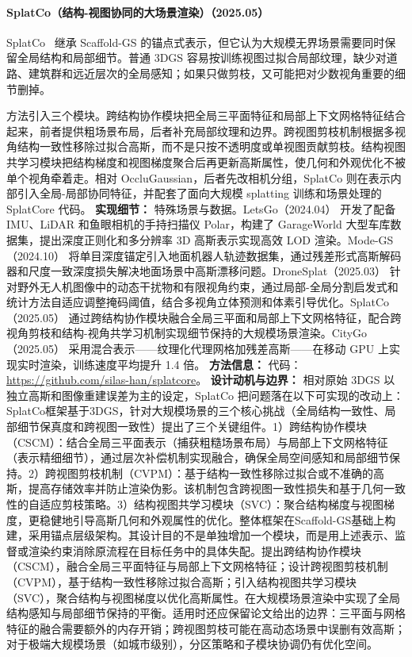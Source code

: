 \paragraph{SplatCo（结构-视图协同的大场景渲染）（2025.05）}
SplatCo~\cite{2505_17951} 继承 Scaffold-GS 的锚点式表示，但它认为大规模无界场景需要同时保留全局结构和局部细节。普通 3DGS 容易按训练视图过拟合局部纹理，缺少对道路、建筑群和远近层次的全局感知；如果只做剪枝，又可能把对少数视角重要的细节删掉。

方法引入三个模块。跨结构协作模块把全局三平面特征和局部上下文网格特征结合起来，前者提供粗场景布局，后者补充局部纹理和边界。跨视图剪枝机制根据多视角结构一致性移除过拟合高斯，而不是只按不透明度或单视图贡献剪枝。结构视图共学习模块把结构梯度和视图梯度聚合后再更新高斯属性，使几何和外观优化不被单个视角牵着走。相对 OccluGaussian，后者先改相机分组，SplatCo 则在表示内部引入全局-局部协同特征，并配套了面向大规模 splatting 训练和场景处理的 SplatCore 代码。
\textbf{实现细节：} 特殊场景与数据。LetsGo（2024.04） 开发了配备 IMU、LiDAR 和鱼眼相机的手持扫描仪 Polar，构建了 GarageWorld 大型车库数据集，提出深度正则化和多分辨率 3D 高斯表示实现高效 LOD 渲染。Mode-GS（2024.10） 将单目深度锚定引入地面机器人轨迹数据集，通过残差形式高斯解码器和尺度一致深度损失解决地面场景中高斯漂移问题。DroneSplat（2025.03） 针对野外无人机图像中的动态干扰物和有限视角约束，通过局部-全局分割启发式和统计方法自适应调整掩码阈值，结合多视角立体预测和体素引导优化。SplatCo（2025.05） 通过跨结构协作模块融合全局三平面和局部上下文网格特征，配合跨视角剪枝和结构-视角共学习机制实现细节保持的大规模场景渲染。CityGo（2025.05） 采用混合表示——纹理化代理网格加残差高斯——在移动 GPU 上实现实时渲染，训练速度平均提升 1.4 倍。
\textbf{方法信息：} 代码：\url{https://github.com/silas-han/splatcore}。
\textbf{设计动机与边界：} 相对原始 3DGS 以独立高斯和图像重建误差为主的设定，SplatCo 把问题落在以下可实现的改动上：SplatCo框架基于3DGS，针对大规模场景的三个核心挑战（全局结构一致性、局部细节保真度和跨视图一致性）提出了三个关键组件。1）跨结构协作模块（CSCM）：结合全局三平面表示（捕获粗糙场景布局）与局部上下文网格特征（表示精细细节），通过层次补偿机制实现融合，确保全局空间感知和局部细节保持。2）跨视图剪枝机制（CVPM）：基于结构一致性移除过拟合或不准确的高斯，提高存储效率并防止渲染伪影。该机制包含跨视图一致性损失和基于几何一致性的自适应剪枝策略。3）结构视图共学习模块（SVC）：聚合结构梯度与视图梯度，更稳健地引导高斯几何和外观属性的优化。整体框架在Scaffold-GS基础上构建，采用锚点层级架构。其设计目的不是单独增加一个模块，而是用上述表示、监督或渲染约束消除原流程在目标任务中的具体失配。提出跨结构协作模块（CSCM），融合全局三平面特征与局部上下文网格特征；设计跨视图剪枝机制（CVPM），基于结构一致性移除过拟合高斯；引入结构视图共学习模块（SVC），聚合结构与视图梯度以优化高斯属性。在大规模场景渲染中实现了全局结构感知与局部细节保持的平衡。适用时还应保留论文给出的边界：三平面与网格特征的融合需要额外的内存开销；跨视图剪枝可能在高动态场景中误删有效高斯；对于极端大规模场景（如城市级别），分区策略和子模块协调仍有优化空间。
